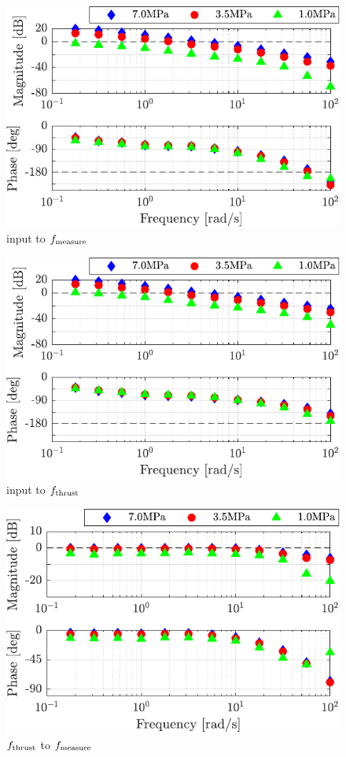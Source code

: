 \begin{figure}[b]
	\centering
		\includegraphics[keepaspectratio, scale = .9]{contents/Appendix_DiffPressure/figure/crop-1018_manubode_in2fmea.pdf}
		\caption{input to $f_\mathrm{measure}$}
		\label{fig:1018_manubode_in2fmea}
\end{figure}
\begin{figure}[t]
	\centering
		\includegraphics[keepaspectratio, scale = .9]{contents/Appendix_DiffPressure/figure/crop-1018_manubode_in2fthr.pdf}
		\caption{input to $f_\mathrm{thrust}$}
		\label{fig:1018_manubode_in2fthr}
\end{figure}
\begin{figure}[t]
	\centering
		\includegraphics[keepaspectratio, scale = .9]{contents/Appendix_DiffPressure/figure/crop-1018_manubode_ftr2fmea.pdf}
		\caption{$f_\mathrm{thrust}$ to $f_\mathrm{measure}$}
		\label{fig:1018_manubode_fthr2fmsr}
\end{figure}